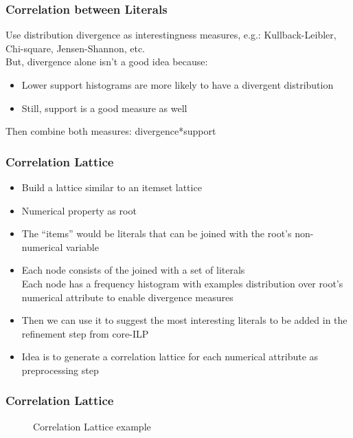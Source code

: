 \documentclass{beamer}
\begin{document}
\begin{frame}
\frametitle{Correlation between Literals}
  Use distribution divergence as interestingness measures, e.g.:
  \quad Kullback-Leibler, Chi-square, Jensen-Shannon, etc. \\
  But, divergence alone isn't a good idea because:
  \begin{itemize}
   \item Lower support histograms are more likely to have a divergent distribution
   \item Still, support is a good measure as well
  \end{itemize}
  Then combine both measures: divergence*support
\end{frame}

\begin{frame}
\frametitle{Correlation Lattice}
  \begin{itemize}
   \item Build a lattice similar to an itemset lattice 
   \item Numerical property as root 
   \item The ``items'' would be literals that can be joined with the root's non-numerical variable 
   \item Each node consists of the joined with a set of literals \\
  Each node has a frequency histogram with examples distribution over root's numerical attribute to enable divergence 
  measures 
   \item Then we can use it to suggest the most interesting literals to be added in the refinement step from core-ILP
   \item Idea is to generate a correlation lattice for each numerical attribute as preprocessing step 
  \end{itemize}
\end{frame}

\begin{frame}
 \frametitle{Correlation Lattice}
\begin{figure}[!h]
  \caption{Correlation Lattice example}
  \centering
  \begin{tikzpicture}
  [scale=0.8,auto=center,every node/.style={circle,fill=black!10,minimum size=1.2cm, font=\tiny}]
  
  \end{tikzpicture}
  \label{fig:lattice}
\end{figure}
\end{frame}
\end{document}
